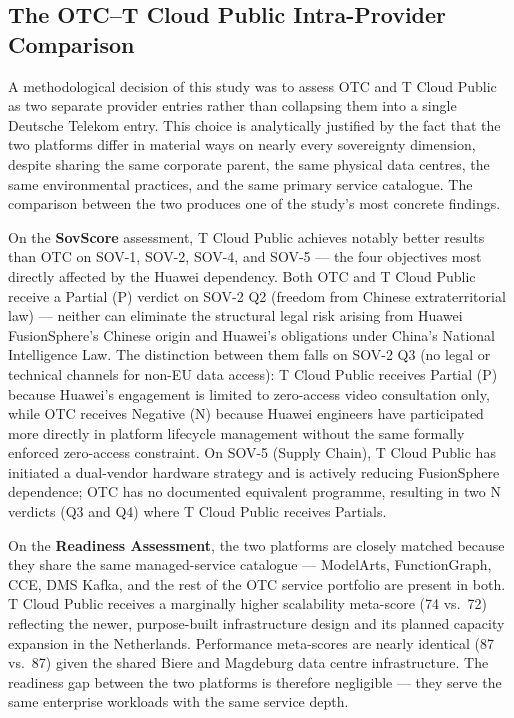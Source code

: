 \subsection{The OTC–T Cloud Public Intra-Provider Comparison}
\label{subsec:otc_tcp_comparison}

A methodological decision of this study was to assess OTC and T Cloud Public as two separate provider entries rather than collapsing them into a single Deutsche Telekom entry. This choice is analytically justified by the fact that the two platforms differ in material ways on nearly every sovereignty dimension, despite sharing the same corporate parent, the same physical data centres, the same environmental practices, and the same primary service catalogue. The comparison between the two produces one of the study's most concrete findings.

On the \textbf{SovScore} assessment, T Cloud Public achieves notably better results than OTC on SOV-1, SOV-2, SOV-4, and SOV-5 — the four objectives most directly affected by the Huawei dependency. Both OTC and T Cloud Public receive a Partial (P) verdict on SOV-2 Q2 (freedom from Chinese extraterritorial law) — neither can eliminate the structural legal risk arising from Huawei FusionSphere's Chinese origin and Huawei's obligations under China's National Intelligence Law. The distinction between them falls on SOV-2 Q3 (no legal or technical channels for non-EU data access): T Cloud Public receives Partial (P) because Huawei's engagement is limited to zero-access video consultation only, while OTC receives Negative (N) because Huawei engineers have participated more directly in platform lifecycle management without the same formally enforced zero-access constraint. On SOV-5 (Supply Chain), T Cloud Public has initiated a dual-vendor hardware strategy and is actively reducing FusionSphere dependence; OTC has no documented equivalent programme, resulting in two N verdicts (Q3 and Q4) where T Cloud Public receives Partials.

On the \textbf{Readiness Assessment}, the two platforms are closely matched because they share the same managed-service catalogue — ModelArts, FunctionGraph, CCE, DMS Kafka, and the rest of the OTC service portfolio are present in both. T Cloud Public receives a marginally higher scalability meta-score (74 vs.\ 72) reflecting the newer, purpose-built infrastructure design and its planned capacity expansion in the Netherlands. Performance meta-scores are nearly identical (87 vs.\ 87) given the shared Biere and Magdeburg data centre infrastructure. The readiness gap between the two platforms is therefore negligible — they serve the same enterprise workloads with the same service depth.

